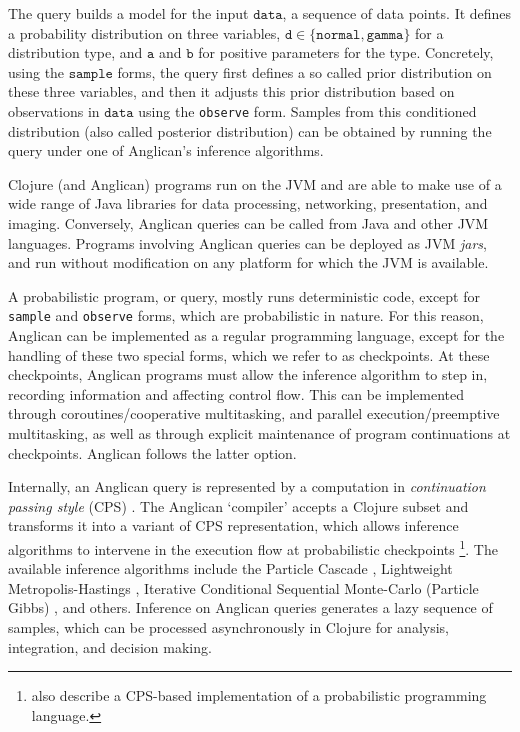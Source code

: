 \documentclass[preprint]{sigplanconf}
\begin{document}
The query builds a model for the input $\texttt{data}$, 
a sequence of data points.
It defines a probability distribution on three variables, 
$\texttt{d} \in \{\texttt{normal},\texttt{gamma}\}$
for a distribution type, and $\texttt{a}$ and $\texttt{b}$ for
positive parameters for the type. Concretely,
using the $\texttt{sample}$ forms, the query
first defines a so called prior distribution on these three variables,
and then it adjusts this prior distribution based on observations in
$\texttt{data}$ using the \texttt{observe} form.
Samples from this conditioned distribution (also called posterior distribution)
can be obtained by running the query under one of Anglican's
inference algorithms.

Clojure (and Anglican) programs run on the JVM and are able to make
use of a wide range of Java libraries for data processing,
networking, presentation, and imaging. Conversely, Anglican queries
can be called from Java and other JVM languages. Programs involving
Anglican queries can be deployed as JVM \textit{jars}, and run without modification on any platform for which the JVM is available.

A probabilistic program, or query, mostly runs deterministic code,
except for \texttt{sample} and \texttt{observe} forms, which are
probabilistic in nature. For this reason, Anglican can be implemented
as a regular programming language, except for the handling of these
two special forms, which we refer to as checkpoints. At these
checkpoints, Anglican programs must allow the inference algorithm to
step in, recording information and affecting control flow. This can
be implemented through coroutines/cooperative multitasking, and
parallel execution/preemptive multitasking, as well as through
explicit maintenance of program continuations at checkpoints.
Anglican follows the latter option.

Internally, an Anglican query is represented by a computation in
\textit{continuation passing style} (CPS) \cite{AJ89}. The Anglican 
`compiler'\iftoggle{full}{, represented by a set of functions in the
\texttt{anglican.trap} namespace,}{} accepts a Clojure subset and 
transforms it into a variant of CPS representation, which allows 
inference algorithms to intervene in the execution flow at 
probabilistic checkpoints \footnote{\cite{GS15} also describe a
CPS-based implementation of a probabilistic programming language.}.
The available inference algorithms include the Particle Cascade
\cite{PWD+14}, Lightweight Metropolis-Hastings \cite{WSG11}, Iterative Conditional Sequential Monte-Carlo (Particle Gibbs)
\cite{WVM14}, and others. Inference on Anglican queries generates a lazy sequence of samples, which can be processed asynchronously in Clojure for analysis, integration, and decision making.
\end{document}
